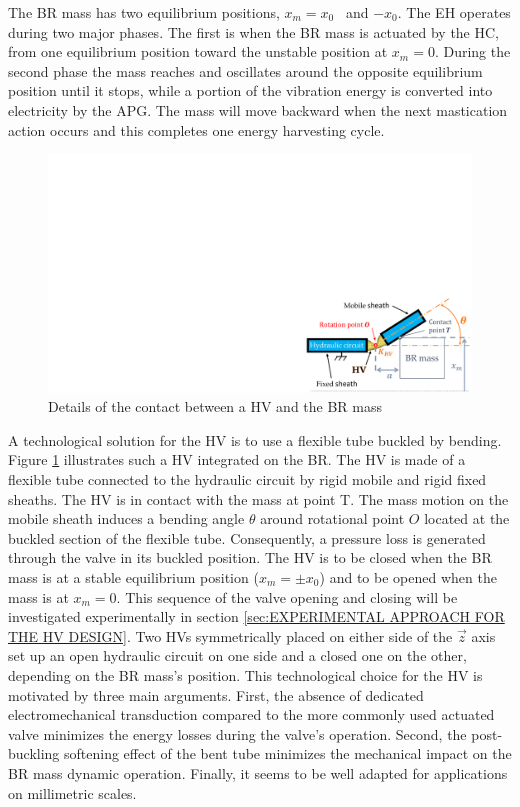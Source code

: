 \documentclass[3p,twocolumn,preprint]{elsarticle}
\begin{document}
The BR mass has two equilibrium positions, \mbox{$x_m = x_0$ } and \mbox{$-x_0$}. The EH operates during two major phases. The first is when the BR mass is actuated by the HC, from one equilibrium position toward the unstable position at $x_m = 0$. During the second phase the mass reaches and oscillates around the opposite equilibrium position until it stops, while a portion of the vibration energy is converted into electricity by the APG. The mass will move backward when the next mastication action occurs and this completes one energy harvesting cycle.
\begin{figure}[!htbp]
	\centering
	\captionsetup{justification=centering}
	\includegraphics[trim={20.5cm 0cm 0cm 11.5cm},clip, width=0.8\linewidth]{figures/HV_actuation_detail.pdf}
	\caption{Details of the contact between a HV and the BR mass} 
	\label{fig:HV_actuation_detail}
\end{figure}

A technological solution for the HV is to use a flexible tube buckled by bending. Figure \ref{fig:HV_actuation_detail} illustrates such a HV integrated on the BR. The HV is made of a flexible tube connected to the hydraulic circuit by rigid mobile and rigid fixed sheaths. The HV is in contact with the mass at point T. The mass motion on the mobile sheath induces a bending angle $\theta$ around rotational point $O$ located at the buckled section of the flexible tube. Consequently, a pressure loss is generated through the valve in its buckled position. The HV is to be closed when the BR mass is at a stable equilibrium position ($x_m=\pm x_0$) and to be opened when the mass is at $x_m=0$. This sequence of the valve opening and closing will be investigated experimentally in section \ref{sec:EXPERIMENTAL APPROACH FOR THE HV DESIGN}. Two HVs symmetrically placed on either side of the $\vec{z}$ axis set up an open hydraulic circuit on one side and a closed one on the other, depending on the BR mass's position. This technological choice for the HV is motivated by three main arguments. First, the absence of dedicated electromechanical transduction compared to the more commonly used actuated valve minimizes the energy losses during the valve's operation. Second, the post-buckling softening effect of the bent tube minimizes the mechanical impact on the BR mass dynamic operation. Finally, it seems to be well adapted for applications on millimetric scales.
\end{document}
